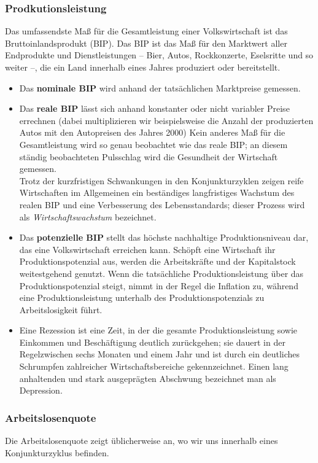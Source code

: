 \documentclass[10pt]{scrartcl}
\begin{document}
\subsubsection{Prodkutionsleistung}
Das umfassendste Maß für die Gesamtleistung einer Volkswirtschaft ist das Bruttoinlandsprodukt (BIP). Das BIP ist das Maß für den Marktwert aller Endprodukte und Dienstleistungen – Bier, Autos, Rockkonzerte, Eselsritte und so weiter –, die ein Land innerhalb eines Jahres produziert oder bereitstellt.
\begin{itemize}
\item Das {\bf nominale BIP} wird anhand der tatsächlichen Marktpreise gemessen.
\item Das {\bf reale BIP }lässt sich anhand konstanter oder nicht variabler Preise errechnen (dabei multiplizieren wir beispielsweise die Anzahl der produzierten Autos mit den Autopreisen des Jahres 2000) Kein anderes Maß für die Gesamtleistung wird so genau beobachtet wie das reale BIP; an diesem ständig beobachteten Pulsschlag wird die Gesundheit der Wirtschaft gemessen. \\
Trotz der kurzfristigen Schwankungen in den Konjunkturzyklen zeigen reife Wirtschaften im Allgemeinen ein beständiges langfristiges Wachstum des realen BIP und eine Verbesserung des Lebensstandards; dieser Prozess wird als {\it Wirtschaftswachstum } bezeichnet. 
\item Das {\bf potenzielle BIP } stellt das höchste nachhaltige Produktionsniveau dar, das eine Volkswirtschaft erreichen kann. Schöpft eine Wirtschaft ihr Produktionspotenzial aus, werden die Arbeitskräfte und der Kapitalstock weitestgehend genutzt. Wenn die tatsächliche Produktionsleistung über das Produktionspotenzial steigt, nimmt in der Regel die Inflation zu, während eine Produktionsleistung unterhalb des Produktionspotenzials zu Arbeitslosigkeit führt.
\item Eine Rezession ist eine Zeit, in der die gesamte Produktionsleistung sowie Einkommen und Beschäftigung deutlich zurückgehen; sie dauert in der Regelzwischen sechs Monaten und einem Jahr und ist durch ein deutliches Schrumpfen zahlreicher Wirtschaftsbereiche gekennzeichnet. Einen lang anhaltenden und stark ausgeprägten
Abschwung bezeichnet man als Depression.
\end{itemize}
\subsubsection{Arbeitslosenquote}
Die Arbeitslosenquote zeigt üblicherweise an, wo wir uns innerhalb eines Konjunkturzyklus befinden.
\end{document}

